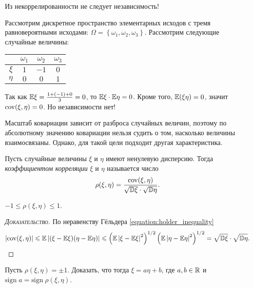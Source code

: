 \documentclass[../main.tex]{subfiles}
\begin{document}
      \begin{exmpl}
       Из некоррелированности не следует независимость!

       Рассмотрим дискретное пространство элементарных исходов с тремя равновероятными исходами: $ \Omega = \left\{ \omega_1, \omega_2,\omega_3 \right\}$. Рассмотрим следующие случайные величины:
       \begin{center}
        \begin{tabular}{r|ccc}
         & $\omega_1$ & $\omega_2$ & $\omega_3$ \\
         \hline
         $\xi$ & $ 1 $ & $-1$ & $0$  \\
         $\eta$ & $0$ & $0$ & $1$ 
        \end{tabular}
       \end{center} Так как $ \mathbb E\xi = \frac{1 + (-1) + 0}{3} = 0 $, то $ \mathbb E\xi \cdot \mathbb E\eta = 0 $. Кроме того, $ \mathbb E(\xi\eta) = 0 $, значит $ \mathrm{cov}(\xi,\eta)=0 $. Но независимости нет!
      \end{exmpl}

      Масштаб ковариации зависит от разброса случайных величин, поэтому по абсолютному значению ковариации нельзя судить о том, насколько величины взаимосвязаны. Однако, для такой цели подходит другая характеристика.

      \begin{df}
       Пусть случайные величины $ \xi $ и $ \eta $ имеют ненулевую дисперсию. Тогда \textit{коэффициентом корреляции} $ \xi $ и $ \eta $ называется число
       \begin{align*}
        \rho(\xi,\eta) = \frac{\mathrm{cov}(\xi,\eta)}{\sqrt{\mathbb D\xi} \cdot \sqrt{\mathbb D\eta}}.
       \end{align*}
      \end{df}

      \begin{prop}
       $ -1 \leqslant \rho(\xi,\eta) \leqslant 1 $.
      \end{prop}
      \begin{proof}[\normalfont\textsc{Доказательство}]
       По неравенству Гёльдера \eqref{equation:holder_inequality}
       \begin{align*}
        \left| \mathrm{cov}(\xi,\eta) \right| \leqslant \mathbb E \left| (\xi-\mathbb E\xi)(\eta-\mathbb E\eta) \right| \leqslant \left( \mathbb E \left| \xi-\mathbb E\xi \right|^{2} \right)^{1 / 2} \left( \mathbb E \left| \eta-\mathbb E\eta \right|^{2} \right)^{1 / 2} = \sqrt{\mathbb D\xi} \cdot \sqrt{\mathbb D\eta}.
       \end{align*}
      \end{proof}

      \begin{exercs*}
       Пусть $ \rho(\xi,\eta) = \pm 1 $. Доказать, что тогда $ \xi = a\eta + b $, где $ a, b \in \mathbb{R} $ и $ \mathrm{sign}\;a = \mathrm{sign}\;\rho(\xi,\eta) $.
      \end{exercs*}

      
\end{document}
